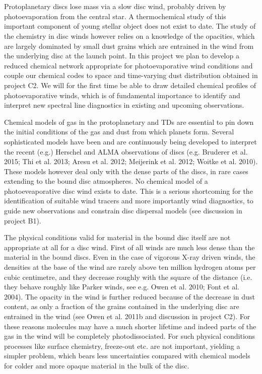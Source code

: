 \vspace{0.5em}
 \\

\vspace{0.5em}
\\
Protoplanetary discs lose mass via a slow disc wind, probably driven by photoevaporation from the central star. A thermochemical study of this important component of young stellar object does not exist to date. The study of the chemistry in disc winds however relies on a knowledge of the opacities, which are largely dominated by small dust grains which are entrained in the wind from the underlying disc at the launch point. In this project we plan to develop a reduced chemical network appropriate for photoevaporative wind conditions and couple our chemical codes to space and time-varying dust distribution obtained in project C2. We will for the first time be able to draw detailed chemical profiles of photoevaporative winds, which is of fundamental importance to identify and interpret new spectral line diagnostics in existing and upcoming observations. 

\vspace{0.5em}

Chemical models of gas in the protoplanetary and TDs are essential to pin down the initial conditions of the gas and dust from which planets form. Several sophisticated models have been and are continuously being developed to interpret the recent (e.g.) Herschel and ALMA observations of discs (e.g. Bruderer et al. 2015; Thi et al. 2013; Aresu et al. 2012; Meijerink et al. 2012; Woitke et al. 2010). 
These models however deal only with the dense parts of the discs, in rare cases extending to the bound disc atmospheres. No chemical model of a photoeveaporative disc wind exists to date. This is a serious shortcoming for the identification of suitable wind tracers and more importantly wind diagnostics, to guide new observations and constrain disc dispersal models (see discussion in project B1). 

The physical conditions valid for material in the bound disc itself are not appropriate at all for a disc wind. First of all winds are much less dense than the material in the bound discs. Even in the case of vigorous X-ray driven winds, the densities at the base of the wind are rarely above ten million hydrogen atoms per cubic centimetre, and they decrease roughly with the square of the distance (i.e. they behave roughly like Parker winds, see e.g. Owen et al. 2010; Font et al. 2004). The opacity in the wind is further reduced because of the decrease in dust content, as only a fraction of the grains contained in the underlying disc are entrained in the wind (see Owen et al. 2011b and discussion in project C2). For these reasons molecules may have a much shorter lifetime and indeed parts of the gas in the wind will be completely photodissociated. For such physical conditions processes like surface chemistry, freeze-out etc. are not important, yielding a simpler problem, which bears less uncertainties compared with chemical models for colder and more opaque material in the bulk of the disc. 


